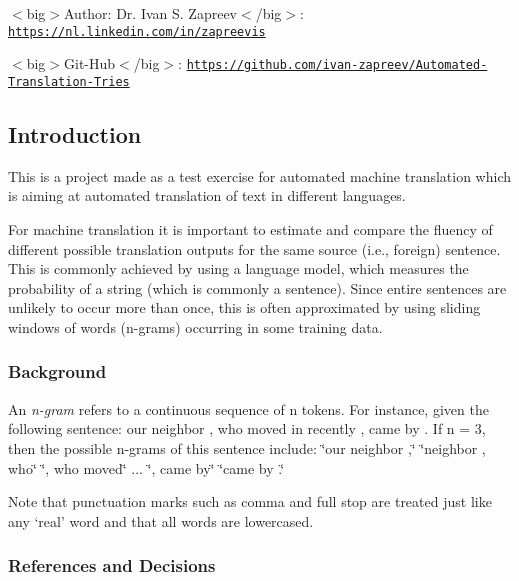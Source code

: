 $<$big$>$Author\+: Dr. Ivan S. Zapreev$<$/big$>$\+: \href{https://nl.linkedin.com/in/zapreevis}{\tt https\+://nl.\+linkedin.\+com/in/zapreevis}

$<$big$>$Git-\/\+Hub$<$/big$>$\+: \href{https://github.com/ivan-zapreev/Automated-Translation-Tries}{\tt https\+://github.\+com/ivan-\/zapreev/\+Automated-\/\+Translation-\/\+Tries}

\subsection*{Introduction}

This is a project made as a test exercise for automated machine translation which is aiming at automated translation of text in different languages.

For machine translation it is important to estimate and compare the fluency of different possible translation outputs for the same source (i.\+e., foreign) sentence. This is commonly achieved by using a language model, which measures the probability of a string (which is commonly a sentence). Since entire sentences are unlikely to occur more than once, this is often approximated by using sliding windows of words (n-\/grams) occurring in some training data.

\subsubsection*{Background}

An {\itshape n-\/gram} refers to a continuous sequence of n tokens. For instance, given the following sentence\+: our neighbor , who moved in recently , came by . If n = 3, then the possible n-\/grams of this sentence include\+: {\ttfamily  \char`\"{}our neighbor ,\char`\"{} \char`\"{}neighbor , who\char`\"{} \char`\"{}, who moved\char`\"{} ... \char`\"{}, came by\char`\"{} \char`\"{}came by .\char`\"{} }

Note that punctuation marks such as comma and full stop are treated just like any ‘real’ word and that all words are lowercased.

\subsubsection*{References and Decisions}

